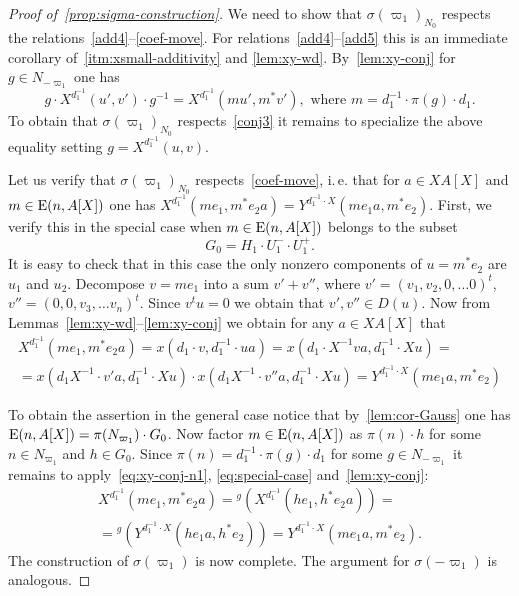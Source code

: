 \begin{proof}[Proof of~\cref{prop:sigma-construction}]
    We need to show that $\sigma(\varpi_1)_{N_0}$ respects the relations~\eqref{add4}--\eqref{coef-move}.
    For relations~\eqref{add4}--\eqref{add5} this is an immediate corollary of~\cref{itm:xsmall-additivity} and \cref{lem:xy-wd}.
    By~\cref{lem:xy-conj} for $g \in N_{-\varpi_1}$ one has
    \begin{equation}
        \label{eq:xy-conj-n1}
        g \cdot X^{d_1^{-1}}(u', v') \cdot g^{-1} = X^{d_1^{-1}}(mu', m^*v'), \text{ where } m = d_1^{-1} \cdot \pi(g) \cdot d_1.
    \end{equation}
    To obtain that $\sigma(\varpi_1)_{N_0}$ respects~\eqref{conj3} it remains to specialize the above equality setting $g = X^{d_1^{-1}}(u, v)$.

    Let us verify that $\sigma(\varpi_1)_{N_0}$ respects~\eqref{coef-move}, i.\,e. that for $a\in XA[X]$ and $m \in \operatorname{E}(n, A[X])$ one has
    $X^{d_1^{-1}}(me_1, m^*e_2 a) = Y^{d_1^{-1} \cdot X}(me_1 a, m^* e_2)$.
    First, we verify this in the special case when $m \in \operatorname{E}(n, A[X])$ belongs to the subset
    \[G_0 = H_{1} \cdot U^-_1 \cdot U^+_1.\]
    It is easy to check that in this case the only nonzero components of $u = m^* e_2$ are $u_1$ and $u_2$.
    Decompose $v = m e_1$ into a sum $v' + v''$, where $v' = (v_1, v_2, 0, \ldots 0)^t,$ $v'' = (0, 0, v_3, \ldots v_n)^t$.
    Since $v^t u = 0$ we obtain that $v', v'' \in D(u)$.
    Now from Lemmas~\ref{lem:xy-wd}--\ref{lem:xy-conj} we obtain for any $a \in XA[X]$ that
    \begin{multline}
        \label{eq:special-case}
        X^{d_1^{-1}}(me_1, m^*e_2 a) =
        x(d_1 \cdot v, d_{1}^{-1} \cdot u a) =
        x(d_1 \cdot X^{-1} va, d_1^{-1} \cdot X u) = \\
        = x(d_1 X^{-1} \cdot v'a, d_1^{-1}\cdot X u) \cdot x(d_1 X^{-1}\cdot v''a, d_1^{-1} \cdot X u) =
        Y^{d_1^{-1} \cdot X}(me_{1}a, m^* e_2)
    \end{multline}

    To obtain the assertion in the general case notice that by~\cref{lem:cor-Gauss} one has $\operatorname{E}(n, A[X]) = \pi(N_{\varpi_1}) \cdot G_0$.
    Now factor $m \in \operatorname{E}(n, A[X])$ as $\pi(n) \cdot h$ for some $n\in N_{\varpi_1}$ and $h \in G_0$.
    Since $\pi(n) = d_1^{-1} \cdot \pi(g) \cdot d_1$ for some $g \in N_{-\varpi_1}$ it remains to apply~\eqref{eq:xy-conj-n1}, \eqref{eq:special-case} and~\cref{lem:xy-conj}:
    \begin{multline}
        \nonumber X^{d_1^{-1}}(me_1, m^*e_{2}a) = {}^{g}(X^{d_1^{-1}}(he_1, h^*e_{2}a)) = \\
        = {}^{g}(Y^{d_1^{-1} \cdot X}(he_{1}a, h^*e_2)) = Y^{d_1^{-1} \cdot X}(me_{1}a, m^{*} e_{2}).
    \end{multline}
    The construction of $\sigma(\varpi_1)$ is now complete.
    The argument for $\sigma(-\varpi_1)$ is analogous.
\end{proof}

